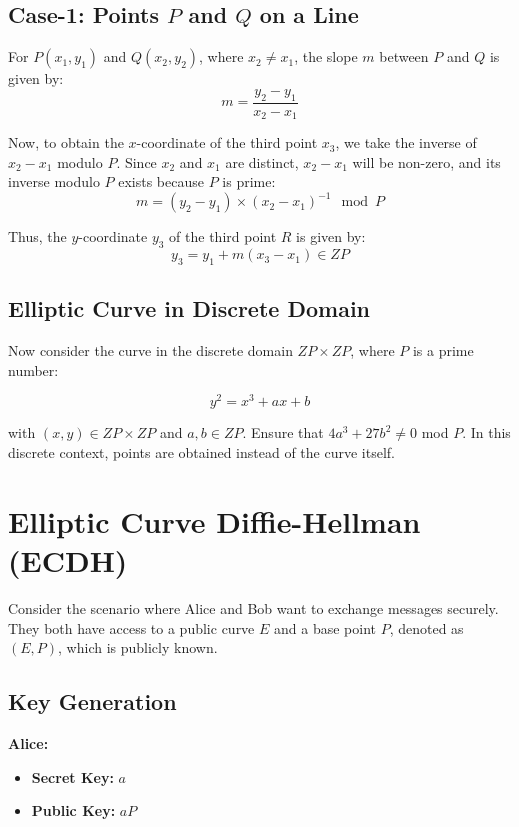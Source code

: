 \documentclass[11pt]{article}
\begin{document}
\subsection{Case-1: Points \(P\) and \(Q\) on a Line}

For \(P(x_1, y_1)\) and \(Q(x_2, y_2)\), where \(x_2 \neq x_1\), the slope \(m\) between \(P\) and \(Q\) is given by:
\[ m = \frac{y_2 - y_1}{x_2 - x_1} \]

Now, to obtain the \(x\)-coordinate of the third point \(x_3\), we take the inverse of \(x_2 - x_1\) modulo \(P\). Since \(x_2\) and \(x_1\) are distinct, \(x_2 - x_1\) will be non-zero, and its inverse modulo \(P\) exists because \(P\) is prime:
\[ m = (y_2 - y_1) \times (x_2 - x_1)^{-1} \mod P \]

Thus, the \(y\)-coordinate \(y_3\) of the third point \(R\) is given by:
\[ y_3 = y_1 + m(x_3 - x_1) \in ZP \]

\subsection{Elliptic Curve in Discrete Domain}

Now consider the curve in the discrete domain \( ZP \times ZP \), where \( P \) is a prime number:

\[ y^2 = x^3 + ax + b \]

with \( (x,y) \in ZP \times ZP \) and \( a, b \in ZP \). Ensure that \( 4a^3 + 27b^2 \neq 0 \) mod \( P \). In this discrete context, points are obtained instead of the curve itself.

\section{Elliptic Curve Diffie-Hellman (ECDH)}

Consider the scenario where Alice and Bob want to exchange messages securely. They both have access to a public curve \(E\) and a base point \(P\), denoted as \((E, P)\), which is publicly known.

\subsection{Key Generation}

\textbf{Alice:}
\begin{itemize}
    \item \textbf{Secret Key:} \(a\)
    \item \textbf{Public Key:} \(aP\)
\end{itemize}
\end{document}

